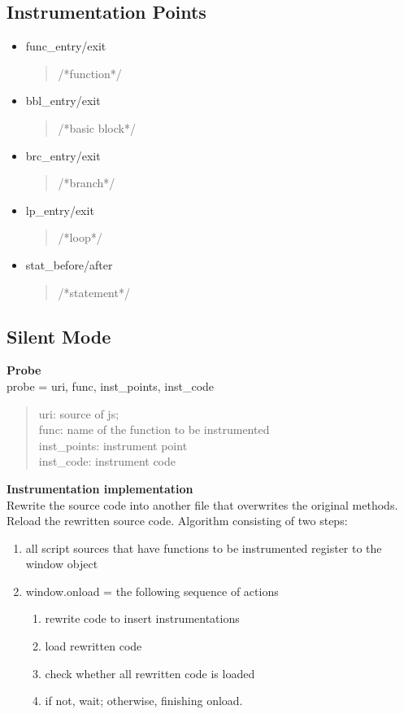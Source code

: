 \documentclass[a4paper,twocolumn,10pt]{article}
\def\denseitems{
  \itemsep1pt plus1pt minus1pt
  \parsep0pt plus0pt
  \parskip0pt\topsep0pt}
\begin{document}
\subsection{Instrumentation Points}
  \begin{itemize}\denseitems
    \item func\_entry/exit
    \begin{quote}
    /*function*/
    \end{quote}

    \item bbl\_entry/exit
    \begin{quote}
    /*basic block*/
    \end{quote}

    \item brc\_entry/exit
    \begin{quote}
    /*branch*/
    \end{quote}

    \item lp\_entry/exit
    \begin{quote}
    /*loop*/
    \end{quote}

    \item stat\_before/after
    \begin{quote}
    /*statement*/
    \end{quote}

  \end{itemize}
\subsection{Silent Mode}
\textbf{Probe}\\ probe = {uri, func, inst\_points, inst\_code}
\begin{quote}
uri: source of js;\\
func: name of the function to be instrumented\\
inst\_points: instrument point\\
inst\_code: instrument code\\
\end{quote}
\textbf{Instrumentation implementation}\\
Rewrite the source code into another file that overwrites the original methods. Reload the rewritten source code.
Algorithm consisting of two steps:
\begin{enumerate}
  \item all script sources that have functions to be instrumented register to the window object
  \item window.onload = the following sequence of actions
  \begin{enumerate}
    \item rewrite code to insert instrumentations
    \item load rewritten code
    \item check whether all rewritten code is loaded
    \item if not, wait; otherwise, finishing onload.
  \end{enumerate}
\end{enumerate}
\end{document}
